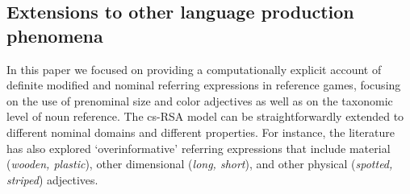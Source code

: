 \documentclass[11pt]{article}
\begin{document}
\subsection{Extensions to other language production phenomena}

In this paper we focused on providing a computationally explicit account of definite modified and nominal referring expressions in reference games, focusing on the use of prenominal size and color adjectives as well as on the taxonomic level of noun reference. The cs-RSA model can be straightforwardly extended to different  nominal domains and different properties. For instance, the literature has also explored `overinformative' referring expressions that include material (\emph{wooden, plastic}), other dimensional (\emph{long, short}), and other physical (\emph{spotted, striped}) adjectives. 


\end{document}
